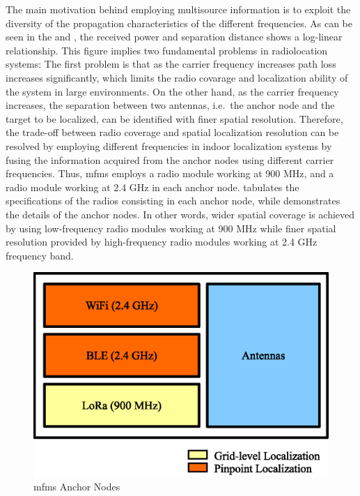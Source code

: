     The main motivation behind employing multisource information is to exploit the diversity of the propagation characteristics of the different frequencies.
    As can be seen in the  and , the received power and separation distance shows a log-linear relationship.
    This figure implies two fundamental problems in radiolocation systems:
    The first problem is that as the carrier frequency increases path loss increases significantly, which limits the radio covarage and localization ability of the system in large environments.
    On the other hand, as the carrier frequency increases, the separation between two antennas, i.e.\ the anchor node and the target to be localized, can be identified with finer spatial resolution.
    Therefore, the trade-off between radio coverage and spatial localization resolution can be resolved by employing different frequencies in indoor localization systems by fusing the information acquired from the anchor nodes using different carrier frequencies.
    Thus, \gls{mfms} employs a radio module working at 900 MHz, and a radio module working at 2.4 GHz in each anchor node.
     tabulates the specifications of the radios consisting in each anchor node, while  demonstrates the details of the anchor nodes.
    In other words, wider spatial coverage is achieved by using low-frequency radio modules working at 900 MHz while finer spatial resolution provided by high-frequency radio modules working at 2.4 GHz frequency band.

    \begin{figure}[thpb]
       \centering
       \includegraphics[width=0.8\linewidth, scale=0.6]{figures/mfms_module.eps}
       \caption{\label{fig:module}\gls{mfms} Anchor Nodes}
    \end{figure}

